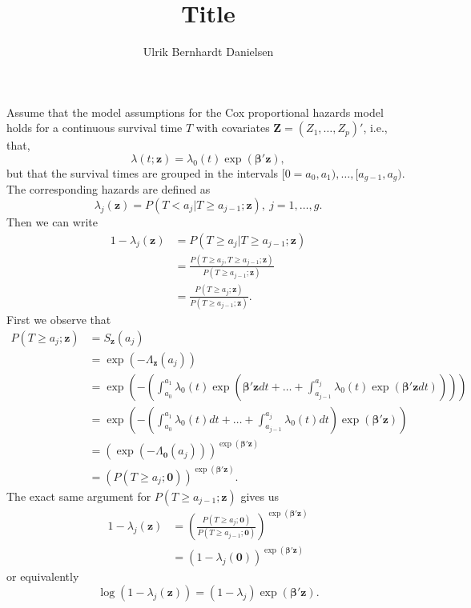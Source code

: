 \documentclass{article}
\title{Title}
\author{Ulrik Bernhardt Danielsen}
\theoremstyle{plain}
\theoremstyle{definition}
\begin{document}
\maketitle

Assume that the model assumptions for the Cox proportional hazards model holds for a continuous survival time $T$ with covariates $\textbf{Z} = (Z_1, \hdots, Z_p)'$, i.e., that,
\begin{equation*}
        \lambda(t; \textbf{z}) = \lambda_0(t) \exp (\boldsymbol{\beta'z}), 
\end{equation*}
but that the survival times are grouped in the intervals $[0 = a_0, a_1), \hdots, [a_{g-1}, a_g)$.
The corresponding hazards are defined as 
\begin{equation*}
        \lambda_j(\textbf{z}) = P(T < a_j |T \geq a_{j-1}; \textbf{z}), \ j = 1, \hdots, g.
\end{equation*}
Then we can write 
\begin{align*}
        1 - \lambda_j(\textbf{z}) &= P(T \geq a_j | T \geq a_{j-1}; \textbf{z}) \\
                                  &= \frac{P(T \geq a_j, T \geq a_{j-1} ; \textbf{z})}{P(T \geq a_{j-1}; \textbf{z})} \\
                                  &= \frac{P(T \geq a_j; \textbf{z})}{P(T \geq a_{j-1}; \textbf{z})}.
\end{align*}
First we observe that 
\begin{align*}
        P(T \geq a_j ; \textbf{z}) &= S_\textbf{z}(a_j) \\\
                                   &= \exp (- \Lambda_\textbf{z}(a_j)) \\
                                   &= \exp (-(\int_{a_0}^{a_1}\lambda_0(t)\exp (\boldsymbol{\beta'z}dt + \hdots + \int_{a_{j-1}}^{a_j}\lambda_0(t)\exp(\boldsymbol{\beta'z}dt)))) \\
                                   &= \exp (-(\int_{a_0}^{a_1}\lambda_0(t)dt + \hdots + \int_{a_{j-1}}^{a_j}\lambda_0(t)dt)\exp (\boldsymbol{\beta'z})) \\
                                   &= \left( \exp(-\Lambda_\textbf{0}(a_j)) \right)^{\exp (\boldsymbol{\beta'z})} \\
                                   &= (P(T \geq a_j ; \textbf{0}))^{\exp (\boldsymbol{\beta'z})}.
\end{align*}
The exact same argument for $P(T \geq a_{j-1} ; \textbf{z})$ gives us 
\begin{align*}
        1 - \lambda_j(\textbf{z}) &= \left( \frac{P(T \geq a_j; \textbf{0})}{P(T \geq a_{j-1}; \textbf{0})} \right)^{\exp (\boldsymbol{\beta'z})} \\
                                  &= (1 - \lambda_j(\textbf{0}))^{\exp (\boldsymbol{\beta'z})}
\end{align*}
or equivalently
\begin{equation*}
        \log (1 - \lambda_j(\textbf{z})) = (1 - \lambda_j) \exp (\boldsymbol{\beta'z}).
\end{equation*}
\end{document}
